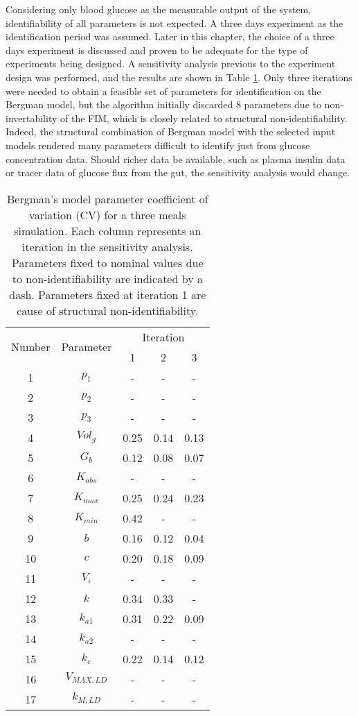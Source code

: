 Considering only blood glucose as the measurable output of the system, identifiability of all parameters is not expected. A three days experiment as the identification period was assumed. Later in this chapter, the choice of a three days experiment is discussed and proven to be adequate for the type of experiments being designed. A sensitivity analysis previous to the experiment design was performed, and the results are shown in Table \ref{tab:bergmanCV}. Only three iterations were needed to obtain a feasible set of parameters for identification on the Bergman model, but the algorithm initially discarded 8 parameters due to non-invertability of the FIM, which is closely related to structural non-identifiability. Indeed, the structural combination of Bergman model with the selected input models rendered many parameters difficult to identify just from glucose concentration data. Should richer data be available, such as plasma insulin data or tracer data of glucose flux from the gut, the sensitivity analysis would change.

\begin{table}[hbtp]
	\centering
	\begin{tabular}{ c | c | c | c | c }
	\multirow{2}{*}{Number} & \multirow{2}{*}{Parameter} & \multicolumn{3}{c}{Iteration} \\
	& & 1 & 2 & 3 \\
	\hline 
	1 & $p_{1}$ & - &	- &	- \\
	2 & $p_{2}$ & - &	- &	-\\
	3 & $p_{3}$ & - &	-	& - \\
	4 & $Vol_{g}$ & 0.25 & 0.14 & 0.13 \\
	5 & $G_{b}$ & 0.12 & 0.08 & 0.07 \\
	6 & $K_{abs}$ & - & - & - \\
	7 & $K_{max}$ & 0.25 & 0.24 & 0.23 \\
	8 & $K_{min}$ & 0.42 & - & - \\
	9 & $b$ & 0.16 & 0.12 & 0.04 \\
	10 & $c$ & 0.20 & 0.18 & 0.09 \\
	11 & $V_{i}$ & - & - & - \\
	12 & $k$ & 0.34 & 0.33 & - \\
  13 & $k_{a1}$ & 0.31 & 0.22 & 0.09 \\
	14 & $k_{a2}$ & - & - & - \\
	15 & $k_{e}$ & 0.22 & 0.14 & 0.12 \\
	16 & $V_{MAX,LD}$ & - & - & - \\
	17 & $k_{M,LD}$ & - & - & - \\
	\end{tabular}
\caption{Bergman's model parameter coefficient of variation (CV) for a three meals simulation. Each column represents an iteration in the sensitivity analysis. Parameters fixed to nominal values due to non-identifiability are indicated by a dash. Parameters fixed at iteration 1 are cause of structural non-identifiability.}
\label{tab:bergmanCV}
\end{table}

